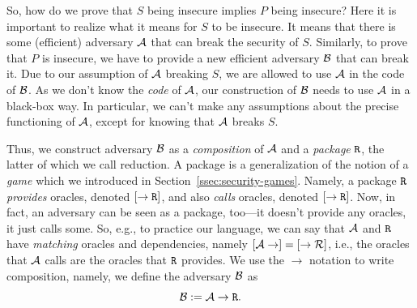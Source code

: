 So, how do we prove that $S$ being insecure implies $P$ being insecure? Here it is important to realize what it means for $S$ to be insecure. It means that there is some (efficient) adversary $\mathcal{A}$ that can break the security of $S$. Similarly, to prove that $P$ is insecure, we have to provide a new efficient adversary $\mathcal{B}$ that can break it. Due to our assumption of $\mathcal{A}$ breaking $S$, we are allowed to use $\mathcal{A}$ in the code of $\mathcal{B}$. As we don't know the \emph{code} of $\mathcal{A}$, our construction of $\mathcal{B}$ needs to use $\mathcal{A}$ in a black-box way. In particular, we can't make any assumptions about the precise functioning of $\mathcal{A}$, except for knowing that $\mathcal{A}$ breaks $S$.

Thus, we construct adversary $\mathcal{B}$ as a \emph{composition} of $\mathcal{A}$ and a \emph{package} $\text{\texttt{R}}$, the latter of which we call reduction. A package is a generalization of the notion of a \emph{game} which we introduced in Section~\ref{ssec:security-games}. Namely, a package $\text{\texttt{R}}$ \emph{provides} oracles, denoted $[\rightarrow\text{\texttt{R}}]$, and also \emph{calls} oracles, denoted $[\rightarrow\text{\texttt{R}}]$. Now, in fact, an adversary can be seen as a package, too---it doesn't provide any oracles, it just calls some. So, e.g., to practice our language, we can say that $\mathcal{A}$ and $\text{\texttt{R}}$ have \emph{matching} oracles and dependencies, namely $[\mathcal{A}\rightarrow]=[\rightarrow\mathcal{R}]$, i.e., the oracles that $\mathcal{A}$ calls are the oracles that $\text{\texttt{R}}$ provides. We use the $\rightarrow$ notation to write composition, namely, we define the adversary $\mathcal{B}$ as
\[\mathcal{B}:=\mathcal{A}\rightarrow\text{\texttt{R}}.\]

